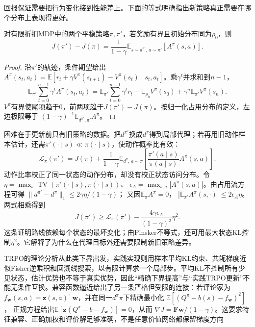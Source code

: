 回报保证需要把行为变化接到性能差上。下面的等式明确指出新策略真正需要在哪个分布上表现得更好。

\begin{theorem}[折扣性能差恒等式]
  \label{thm:rl-learning-performance-difference}
  对有限折扣MDP中的两个平稳策略$\pi,\pi'$，若奖励有界且初始分布同为$\rho_0$，则
  \begin{equation}
    J(\pi')-J(\pi)
       =\frac{1}{1-\gamma}
          \mathbb E_{s\sim d^{\pi'},\,a\sim\pi'}[A^\pi(s,a)].
    \label{eq:rl-learning-performance-difference}
  \end{equation}
\end{theorem}
\begin{proof}
  沿$\pi'$的轨迹，条件期望给出
  $A^\pi(s_t,a_t)
    =\mathbb E[r_t+\gamma V^\pi(s_{t+1})-V^\pi(s_t)
                \mid s_t,a_t]$。乘$\gamma^t$并求和到$n-1$，
  \[
    \mathbb E_{\pi'}\sum_{t=0}^{n-1}\gamma^t A^\pi(s_t,a_t)
      =\mathbb E_{\pi'}\sum_{t=0}^{n-1}\gamma^t r_t
         -\mathbb E_{\rho_0}V^\pi(s_0)
         +\gamma^n\mathbb E_{\pi'}V^\pi(s_n).
  \]
  $V^\pi$有界使尾项趋于0，前两项趋于$J(\pi')-J(\pi)$。按归一化占用分布的定义，左边极限等于
  $(1-\gamma)^{-1}\mathbb E_{d^{\pi'},\pi'}A^\pi$。
\end{proof}

困难在于更新前只有旧策略的数据。把$d^{\pi'}$换成$d^\pi$得到局部代理；若再用旧动作样本估计，还需$\pi'(\cdot\mid s)\ll\pi(\cdot\mid s)$，使动作概率比有效：
\[
  \mathcal L_\pi(\pi')
    =J(\pi)+\frac1{1-\gamma}
         \mathbb E_{d^\pi,\,a\sim\pi}
           \left[\frac{\pi'(a\mid s)}{\pi(a\mid s)}
                         A^\pi(s,a)\right].
\]
动作比率校正了同一状态的动作分布，却没有校正状态访问分布。令
$\eta=\max_s\operatorname{TV}(\pi'(\cdot\mid s),\pi(\cdot\mid s))$、
$\epsilon_A=\max_{s,a}|A^\pi(s,a)|$。由占用流方程可得
$\lVert d^{\pi'}-d^\pi\rVert_1\leq2\gamma\eta/(1-\gamma)$；
又因$\mathbb E_\pi A^\pi=0$，
$|\mathbb E_{\pi'}A^\pi(s,\cdot)|\leq2\epsilon_A\eta$。两式相乘得到
\begin{equation}
  J(\pi')\geq\mathcal L_\pi(\pi')
       -\frac{4\gamma\epsilon_A}{(1-\gamma)^2}\eta^2 .
  \label{eq:rl-learning-trpo-bound}
\end{equation}
这条证明路线依赖每个状态的最坏变化；由Pinsker不等式，还可用最大状态KL控制$\eta^2$。它解释了为什么在代理目标外还需要限制新旧策略差异。

TRPO的理论分析从此类下界出发，实践实现则用样本平均KL约束、共轭梯度近似Fisher逆乘积和回溯线搜索，以有限计算求一个局部步。平均KL不控制所有少见状态，估计优势也不等于真实优势，因此“精确下界提高”与“实践TRPO更新”不能无条件互换。兼容函数逼近给出了另一条严格但受限的连接：若评论家为
$f_{\bm w}(s,a)=\bm z(s,a)^\top\bm w$，并在同一$d^\pi\pi$下精确最小化
$\mathbb E[(Q^\pi-b(s)-f_{\bm w})^2]$，
正规方程给出$\mathbb E[\bm z(Q^\pi-b-f_{\bm w})]=0$，从而
$\nabla J=\bm F\bm w/(1-\gamma)$。这要求特征兼容、正确加权和评价解足够准确，不是任意价值网络都保留梯度方向

